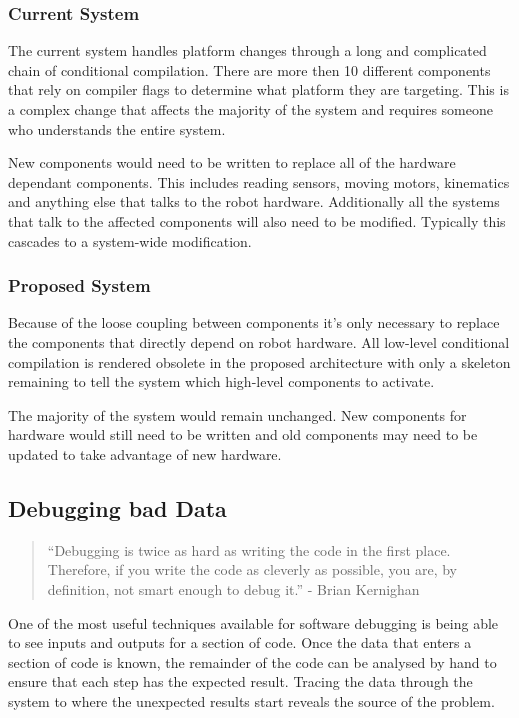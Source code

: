 \documentclass[english,12pt]{scrartcl}
\begin{document}
			\subsubsection{Current System}
				The current system handles platform changes through a long and complicated chain of conditional compilation. There are
				more then 10 different components that rely on compiler flags to determine what platform they are targeting. This is a 
				complex change that affects the majority of the system and requires someone who understands the entire system.
				
				New components would need to be written to replace all of the hardware dependant components. This includes reading sensors,
				moving motors, kinematics and anything else that talks to the robot hardware. Additionally all the systems that talk to the affected
				components will also need to be modified. Typically this cascades to a system-wide modification.
			\subsubsection{Proposed System}
				Because of the loose coupling between components it's only necessary to replace the components that directly depend on
				robot hardware. All low-level conditional compilation is rendered obsolete in the proposed architecture with only a skeleton
				remaining to tell the system which high-level components to activate.
				
				The majority of the system would remain unchanged. New components for hardware would still need to be written and
				old components may need to be updated to take advantage of new hardware.

		\subsection{Debugging bad Data}
			\begin{quote}``Debugging is twice as hard as writing the code in the first place. Therefore, if you write the code as cleverly as possible, you are, by definition, not smart enough to debug it.'' - Brian Kernighan\end{quote}
			One of the most useful techniques available for software debugging is being able to see inputs and outputs for a section of code. Once the data that enters a section
			of code is known, the remainder of the code can be analysed by hand to ensure that each
			step has the expected result. Tracing the data through the system to where the unexpected results start reveals the source of the problem.
\end{document}
